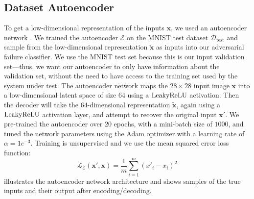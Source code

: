 \subsection{Dataset Autoencoder}\label{sec:autoencoder}
To get a low-dimensional representation of the inputs $\mathbf{x}$, we used an autoencoder network \citep{kramer1991nonlinear}.
We trained the autoencoder $\mathcal{E}$ on the MNIST test dataset $\mathcal{D}_\text{test}$ and sample from the low-dimensional representation $\tilde{\mathbf{x}}$ as inputs into our adversarial failure classifier.
We use the MNIST test set because this is our input validation set---thus, we want our autoencoder to only have information about the validation set, without the need to have access to the training set used by the system under test.
The autoencoder network maps the $28\times28$ input image $\mathbf x$ into a low-dimensional latent space of size $64$ using a $\operatorname{LeakyReLU}$ activation.
Then the decoder will take the $64$-dimensional representation $\tilde{\mathbf{x}}$, again using a $\operatorname{LeakyReLU}$ activation layer, and attempt to recover the original input $\mathbf x'$.
We pre-trained the autoencoder over $20$ epochs, with a mini-batch size of $1000$, and tuned the network parameters using the Adam optimizer with a learning rate of $\alpha=1e^{-3}$.
Training is unsupervised and we use the mean squared error loss function:
\begin{equation*}
\mathcal{L}_\mathcal{E}(\mathbf{x}', \mathbf{x}) = \frac{1}{m} \sum_{i=1}^m \left( x'_i - x_i \right)^2
\end{equation*}
 illustrates the autoencoder network architecture and  shows samples of the true inputs and their output after encoding/decoding.


